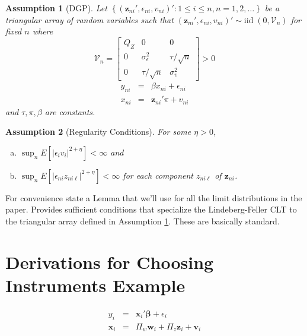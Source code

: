 \documentclass[12pt]{article}
\newtheorem{assump}{Assumption}[section]
\theoremstyle{definition}
\begin{document}
\newpage
\begin{assump}[DGP]
\label{assump:local}
  Let $\left\{\left(\mathbf{z}_{ni}', \epsilon_{ni}, v_{ni}\right)'\colon 1\leq i \leq n, n = 1, 2, \hdots\right\}$ be a triangular array of random variables such that $\left(\mathbf{z}_{ni}', \epsilon_{ni}, v_{ni}\right)' \sim \mbox{iid} \;(0, \mathcal{V}_n)$ for fixed $n$ where
		\begin{equation}
		\mathcal{V}_n = \left[ \begin{array}{ccc}
	Q_Z & 0 & 0\\
	0 & \sigma_\epsilon^2 & \tau/\sqrt{n}\\
	0 & \tau/\sqrt{n}& \sigma_v^2
\end{array}	 \right] > 0
		\end{equation}
			\begin{eqnarray}
			y_{ni} &=& \beta x_{ni}  + \epsilon_{ni}\\
	x_{ni} &=& \mathbf{z}_{ni}' \pi + v_{ni}
		\end{eqnarray}
and $\tau,\pi, \beta$ are constants.
\end{assump}


\begin{assump}[Regularity Conditions]
  \label{assump:reg}For some $\eta > 0$,
  \begin{enumerate}[(a)]
		\item $\sup_n E\left[ \lvert\epsilon_iv_i \rvert^{2+\eta}\right]<\infty$ and
		\item $\sup_n E\left[ \lvert \epsilon_{ni} z_{ni\ell} \rvert^{2+\eta} \right]<\infty$ for each component $z_{ni\ell}$ of $\mathbf{z}_{ni}$.
	\end{enumerate}
\end{assump}


For convenience state a Lemma that we'll use for all the limit distributions in the paper. Provides sufficient conditions that specialize the Lindeberg-Feller CLT to the triangular array defined in Assumption \ref{assump:local}. These are basically standard.



\section{Derivations for Choosing Instruments Example}

\begin{eqnarray}
    y_i &=& \mathbf{x}_i' \boldsymbol{\beta} +  \epsilon_i\\
    \mathbf{x}_i &=& \Pi_w \mathbf{w}_i + \Pi_z \mathbf{z}_i + \mathbf{v}_i
\end{eqnarray}
\end{document}
